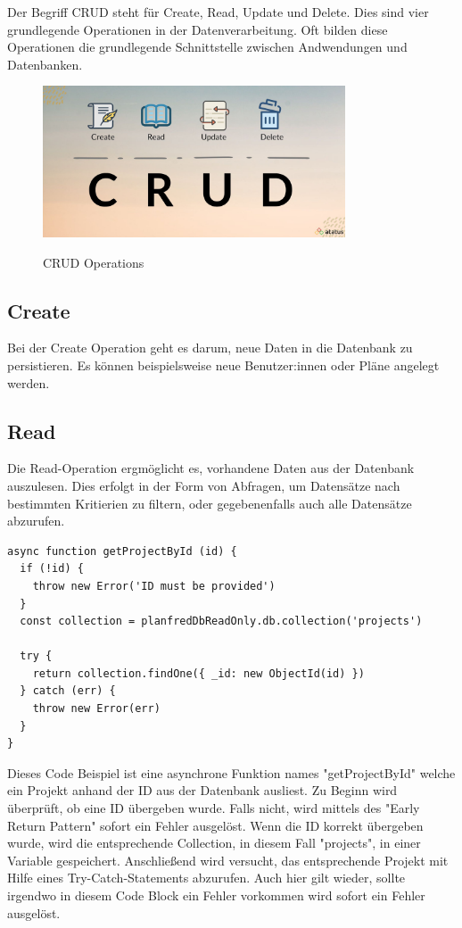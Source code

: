 Der Begriff CRUD steht für Create, Read, Update und Delete. Dies sind vier grundlegende Operationen in der Datenverarbeitung. Oft bilden diese Operationen die grundlegende Schnittstelle zwischen Andwendungen und Datenbanken.
\newline
\begin{figure}[h!]
    \centering
    \includegraphics[width=0.8\textwidth]{pics/CRUD.jpeg}
    \caption{CRUD Operations}
    \label{fig:enter-label}
    \cite{crud_grafik}
\end{figure}


 \subsection{Create}

 Bei der Create Operation geht es darum, neue Daten in die Datenbank zu persistieren. Es können beispielsweise neue Benutzer:innen oder Pläne angelegt werden.


 \subsection{Read}

 Die Read-Operation ergmöglicht es, vorhandene Daten aus der Datenbank auszulesen. Dies erfolgt in der Form von Abfragen, um Datensätze nach bestimmten Kritierien zu filtern, oder gegebenenfalls auch alle Datensätze abzurufen.

\begin{lstlisting}[caption=Read-Operation]
async function getProjectById (id) {
  if (!id) {
    throw new Error('ID must be provided')
  }
  const collection = planfredDbReadOnly.db.collection('projects')

  try {
    return collection.findOne({ _id: new ObjectId(id) })
  } catch (err) {
    throw new Error(err)
  }
}
\end{lstlisting}

Dieses Code Beispiel ist eine asynchrone Funktion names "getProjectById" welche ein Projekt anhand der ID aus der Datenbank ausliest.\newline
Zu Beginn wird überprüft, ob eine ID übergeben wurde. Falls nicht, wird mittels des "Early Return Pattern" sofort ein Fehler ausgelöst. Wenn die ID korrekt übergeben wurde, wird die entsprechende Collection, in diesem Fall "projects", in einer Variable gespeichert. Anschließend wird versucht, das entsprechende Projekt mit Hilfe eines Try-Catch-Statements abzurufen. Auch hier gilt wieder, sollte irgendwo in diesem Code Block ein Fehler vorkommen wird sofort ein Fehler ausgelöst.



